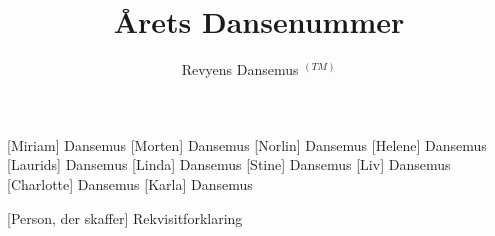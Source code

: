 \documentclass[a4paper,11pt]{article}
\title{Årets Dansenummer}
\author{Revyens Dansemus $^{(TM)}$}
\begin{document}
\maketitle

\begin{roles}
	[Miriam] Dansemus
	[Morten] Dansemus
	[Norlin] Dansemus
	[Helene] Dansemus
	[Laurids] Dansemus
	[Linda] Dansemus
	[Stine] Dansemus
	[Liv] Dansemus
	[Charlotte] Dansemus
	[Karla] Dansemus
    
\end{roles}

\begin{props}
    [Person, der skaffer] Rekvisitforklaring
\end{props}


\begin{sketch}



\end{sketch}
\end{document}

